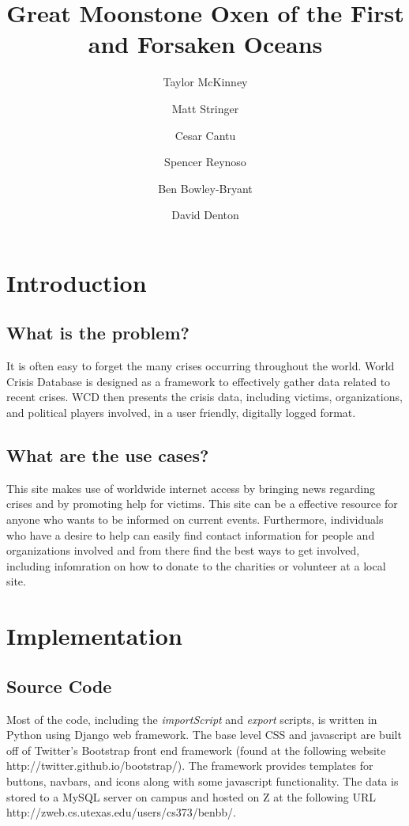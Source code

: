 \documentclass[12pt]{report}
\title{Great Moonstone Oxen of the First and Forsaken Oceans}
\author{
    Taylor McKinney
    \and Matt Stringer
    \and Cesar Cantu
    \and Spencer Reynoso
    \and Ben Bowley-Bryant
    \and David Denton}
\begin{document}
\maketitle

\section*{Introduction}
\subsection*{What is the problem?}
\hfill


It is often easy to forget the many crises occurring throughout the world.
World Crisis Database is designed as a framework to effectively gather data related to recent crises. WCD then presents the crisis data, including victims, organizations, and political players involved, in a user friendly, digitally logged format.

\subsection*{What are the use cases?}
\hfill


This site makes use of worldwide internet access by bringing news regarding crises and by promoting help for victims. This site can be a effective resource for anyone who wants to be informed on current events. Furthermore, individuals who have a desire to help can easily find contact information for people and organizations involved and from there find the best ways to get involved, including infomration on how to donate to the charities or volunteer at a local site.

\newpage
\section*{Implementation}
\hfill


\subsection*{Source Code}
\hfill


Most of the code, including the \emph{importScript} and \emph{export} scripts, is written in Python using Django web framework. The base level CSS and javascript are built off of Twitter's Bootstrap front end framework (found at the following website http://twitter.github.io/bootstrap/). The framework provides templates for buttons, navbars, and icons along with some javascript functionality. The data is stored to a MySQL server on campus and hosted on Z at the following URL http://zweb.cs.utexas.edu/users/cs373/benbb/.
\end{document}
